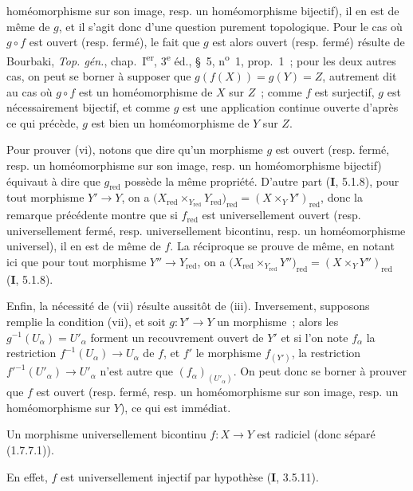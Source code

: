 homéomorphisme sur son image, resp. un homéomorphisme bijectif), il en est de
même de $g$, et il s'agit donc d'une question purement topologique. Pour le
cas où $g\circ f$ est ouvert (resp. fermé), le fait que $g$ est alors ouvert
(resp. fermé) résulte de Bourbaki, \emph{Top. gén.}, chap.~I\textsuperscript{er},
3\textsuperscript{e} éd., \S~5, n\textsuperscript{o}~1, prop.~1~; pour les
deux autres cas, on peut se borner à supposer que
$g(f(X))=g(Y)=Z$, autrement dit au cas où $g\circ f$ est un homéomorphisme de
$X$ sur $Z$~; comme $f$ est surjectif, $g$ est nécessairement bijectif, et
comme $g$ est une application continue ouverte d'après ce qui précède, $g$
est bien un homéomorphisme de $Y$ sur $Z$.

Pour prouver (vi), notons que dire qu'un morphisme $g$ est ouvert (resp.
fermé, resp. un homéomorphisme sur son image, resp. un homéomorphisme
bijectif) équivaut à dire que $g_{\mathrm{red}}$ possède la même propriété.
D'autre part (\textbf{I}, 5.1.8), pour tout morphisme $Y'\to Y$, on a
$\bigl(X_{\mathrm{red}}\times_{Y_{\mathrm{red}}}Y_{\mathrm{red}}\bigr)_{\mathrm{red}}
=(X\times_Y Y')_{\mathrm{red}}$,
donc la remarque précédente montre que si $f_{\mathrm{red}}$ est
universellement ouvert (resp. universellement fermé, resp. universellement
bicontinu, resp. un homéomorphisme universel), il en est de même de $f$. La
réciproque se prouve de même, en notant ici que pour tout morphisme
$Y''\to Y_{\mathrm{red}}$, on a
$\bigl(X_{\mathrm{red}}\times_{Y_{\mathrm{red}}}Y''\bigr)_{\mathrm{red}}
=(X\times_Y Y'')_{\mathrm{red}}$
(\textbf{I}, 5.1.8).

Enfin, la nécessité de (vii) résulte aussitôt de (iii). Inversement, supposons
remplie la condition (vii), et soit $g:Y'\to Y$ un morphisme~; alors les
$g^{-1}(U_\alpha)=U'_\alpha$ forment un recouvrement ouvert de $Y'$ et si
l'on note $f_\alpha$ la restriction $f^{-1}(U_\alpha)\to U_\alpha$ de $f$,
et $f'$ le morphisme $f_{(Y')}$, la restriction
$f'^{-1}(U'_\alpha)\to U'_\alpha$ n'est autre que
$(f_\alpha)_{(U'_\alpha)}$. On peut donc se borner à prouver que $f$ est
ouvert (resp. fermé, resp. un homéomorphisme sur son image, resp. un
homéomorphisme sur $Y$), ce qui est immédiat.

\begin{proposition}[2.4.4]
\label{IV.2.4.4-fr}
Un morphisme universellement bicontinu $f:X\to Y$ est radiciel (donc séparé
\textup{(1.7.7.1)}).
\end{proposition}

En effet, $f$ est universellement injectif par hypothèse (\textbf{I}, 3.5.11).

